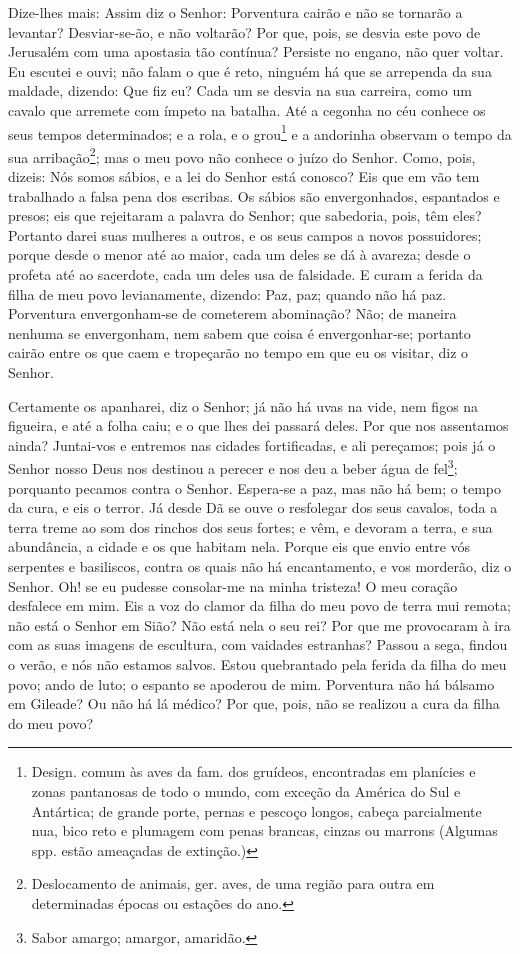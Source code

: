 Dize-lhes mais: Assim diz o Senhor: Porventura cairão e não se
tornarão a levantar? Desviar-se-ão, e não voltarão? Por que,
pois, se desvia este povo de Jerusalém com uma apostasia tão
contínua? Persiste no engano, não quer voltar. Eu escutei e
ouvi; não falam o que é reto, ninguém há que se arrependa da sua
maldade, dizendo: Que fiz eu? Cada um se desvia na sua carreira,
como um cavalo que arremete com ímpeto na batalha. Até a cegonha
no céu conhece os seus tempos determinados; e a rola, e o
grou\footnote{Design. comum às aves da fam. dos gruídeos,
encontradas em planícies e zonas pantanosas de todo o mundo, com
exceção da América do Sul e Antártica; de grande porte, pernas e
pescoço longos, cabeça parcialmente nua, bico reto e plumagem com
penas brancas, cinzas ou marrons (Algumas spp. estão ameaçadas de
extinção.)} e a andorinha observam o tempo da sua
arribação\footnote{Deslocamento de animais, ger. aves, de uma região
para outra em determinadas épocas ou estações do ano.}; mas o meu
povo não conhece o juízo do Senhor. Como, pois, dizeis: Nós
somos sábios, e a lei do Senhor está conosco? Eis que em vão tem
trabalhado a falsa pena dos escribas. Os sábios são
envergonhados, espantados e presos; eis que rejeitaram a palavra do
Senhor; que sabedoria, pois, têm eles? Portanto darei suas
mulheres a outros, e os seus campos a novos possuidores; porque
desde o menor até ao maior, cada um deles se dá à avareza; desde o
profeta até ao sacerdote, cada um deles usa de falsidade. E
curam a ferida da filha de meu povo levianamente, dizendo: Paz, paz;
quando não há paz. Porventura envergonham-se de cometerem
abominação? Não; de maneira nenhuma se envergonham, nem sabem que
coisa é envergonhar-se; portanto cairão entre os que caem e
tropeçarão no tempo em que eu os visitar, diz o Senhor.

Certamente os apanharei, diz o Senhor; já não há uvas na vide,
nem figos na figueira, e até a folha caiu; e o que lhes dei passará
deles. Por que nos assentamos ainda? Juntai-vos e entremos
nas cidades fortificadas, e ali pereçamos; pois já o Senhor nosso
Deus nos destinou a perecer e nos deu a beber água de
fel\footnote{Sabor amargo; amargor, amaridão.}; porquanto pecamos
contra o Senhor. Espera-se a paz, mas não há bem; o tempo da
cura, e eis o terror. Já desde Dã se ouve o resfolegar dos
seus cavalos, toda a terra treme ao som dos rinchos dos seus fortes;
e vêm, e devoram a terra, e sua abundância, a cidade e os que
habitam nela. Porque eis que envio entre vós serpentes e
basiliscos, contra os quais não há encantamento, e vos morderão, diz
o Senhor. Oh! se eu pudesse consolar-me na minha tristeza! O
meu coração desfalece em mim. Eis a voz do clamor da filha do
meu povo de terra mui remota; não está o Senhor em Sião? Não está
nela o seu rei? Por que me provocaram à ira com as suas imagens de
escultura, com vaidades estranhas? Passou a sega, findou o
verão, e nós não estamos salvos. Estou quebrantado pela
ferida da filha do meu povo; ando de luto; o espanto se apoderou de
mim. Porventura não há bálsamo em Gileade? Ou não há lá
médico? Por que, pois, não se realizou a cura da filha do meu povo?

